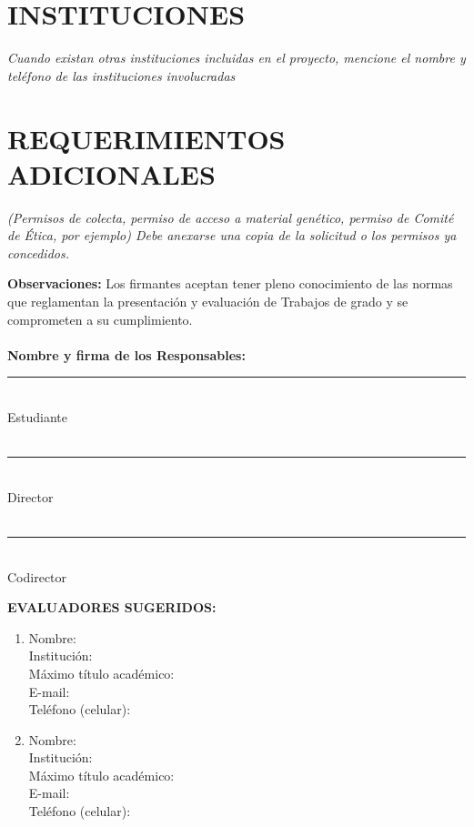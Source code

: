 \documentclass[12pt,letterpaper]{article}
\begin{document}
\section{INSTITUCIONES}
\emph{ Cuando existan otras instituciones incluidas en el proyecto, mencione el nombre y teléfono de las instituciones involucradas}

\section{REQUERIMIENTOS ADICIONALES}
\emph{(Permisos de colecta, permiso de acceso a material genético, permiso de Comité de Ética, por ejemplo) Debe anexarse una copia de la solicitud o los permisos ya concedidos.}

\newpage

\textbf{Observaciones:} Los firmantes aceptan tener pleno conocimiento de las normas que reglamentan la presentación y evaluación de Trabajos de grado y se comprometen a su cumplimiento.\\
\\
\textbf{Nombre y firma de los Responsables:}
\vspace{1 cm}\\
\noindent\rule{5cm}{0.4pt}\\
Estudiante\\
\vspace{2 pt}\\
\noindent\rule{5cm}{0.4pt}\\
Director\\
\vspace{2 pt}\\
\noindent\rule{5cm}{0.4pt}\\
Codirector\\

\begin{framed}
\textbf{EVALUADORES SUGERIDOS:}
\begin{enumerate}
\item Nombre:\\ 
Institución:\\
Máximo título académico:\\ 
E-mail:\\
Teléfono (celular):\\

\item Nombre:\\
Institución:\\
Máximo título académico:\\
E-mail:\\
Teléfono (celular):\\
\end{enumerate}
\end{framed}
\end{document}
